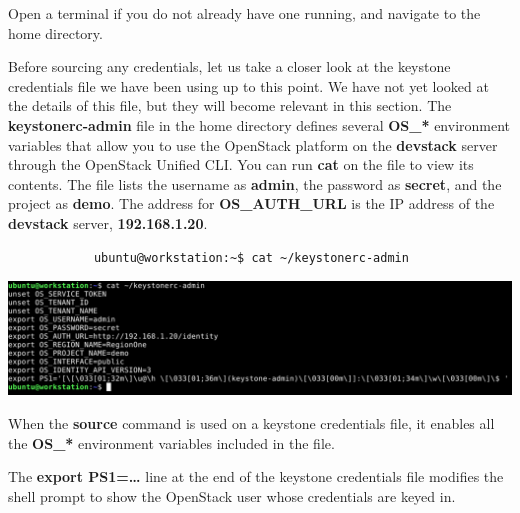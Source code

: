 \documentclass[letterpaper, 12pt]{article}
\begin{document}
\begin{enumerate}
    \begin{labstep}
        Open a terminal if you do not already have one running, and navigate to the home directory.
    \end{labstep}

    \begin{labstep}
        Before sourcing any credentials, let us take a closer look at the keystone credentials file we have been using up to this point.
        We have not yet looked at the details of this file, but they will become relevant in this section.
        The \textbf{keystonerc-admin} file in the home directory defines several \textbf{OS\_*} environment variables that allow you to use the OpenStack platform on the \textbf{devstack} server through the OpenStack Unified CLI.
        You can run \textbf{cat} on the file to view its contents.
        The file lists the username as \textbf{admin}, the password as \textbf{secret}, and the project as \textbf{demo}.
        The address for \textbf{OS\_AUTH\_URL} is the IP address of the \textbf{devstack} server, \textbf{192.168.1.20}.
        \begin{lstlisting}
            ubuntu@workstation:~$ cat ~/keystonerc-admin
        \end{lstlisting}

        \begin{center}
            \includegraphics[width=\linewidth]{images/part4/step2.png}
        \end{center}
    \end{labstep}

    \begin{notebox}
        When the \textbf{source} command is used on a keystone credentials file, it enables all the \textbf{OS\_*} environment variables included in the file.
    \end{notebox}

    \begin{notebox}
        The \textbf{export PS1=…} line at the end of the keystone credentials file modifies the shell prompt to show the OpenStack user whose credentials are keyed in.
    \end{notebox}


\end{enumerate}
\end{document}
